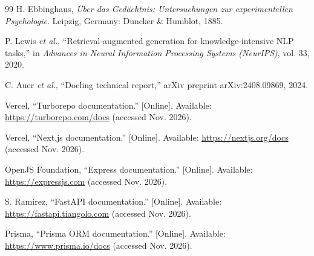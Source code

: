 \documentclass[12pt,a4paper,oneside]{report}
\begin{document}
\begin{thebibliography}{99}
H. Ebbinghaus, \emph{\"Uber das Ged\"achtnis: Untersuchungen zur
experimentellen Psychologie}. Leipzig, Germany: Duncker \& Humblot, 1885.

P. Lewis \emph{et al.}, ``Retrieval-augmented generation for
knowledge-intensive NLP tasks,'' in \emph{Advances in Neural Information
Processing Systems (NeurIPS)}, vol. 33, 2020.

C. Auer \emph{et al.}, ``Docling technical report,'' arXiv preprint
arXiv:2408.09869, 2024.

Vercel, ``Turborepo documentation.'' [Online]. Available:
\url{https://turborepo.com/docs} (accessed Nov. 2026).

Vercel, ``Next.js documentation.'' [Online]. Available:
\url{https://nextjs.org/docs} (accessed Nov. 2026).

OpenJS Foundation, ``Express documentation.'' [Online]. Available:
\url{https://expressjs.com} (accessed Nov. 2026).

S. Ram\'irez, ``FastAPI documentation.'' [Online]. Available:
\url{https://fastapi.tiangolo.com} (accessed Nov. 2026).

Prisma, ``Prisma ORM documentation.'' [Online]. Available:
\url{https://www.prisma.io/docs} (accessed Nov. 2026).

\end{thebibliography}
\end{document}
